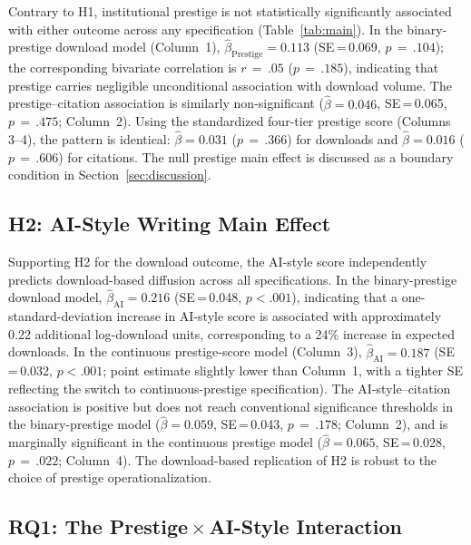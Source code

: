 \documentclass[12pt,a4paper]{article}
\begin{document}
Contrary to H1, institutional prestige is not statistically significantly
associated with either outcome across any specification
(Table~\ref{tab:main}).
In the binary-prestige download model (Column~1),
$\hat{\beta}_{\text{Prestige}} = 0.113$ (SE\,=\,0.069, $p\,=\,.104$);
the corresponding bivariate correlation is $r\,=\,.05$ ($p\,=\,.185$),
indicating that prestige carries negligible unconditional association
with download volume.
The prestige--citation association is similarly non-significant
($\hat{\beta} = 0.046$, SE\,=\,0.065, $p\,=\,.475$; Column~2).
Using the standardized four-tier prestige score (Columns 3--4),
the pattern is identical: $\hat{\beta} = 0.031$ ($p\,=\,.366$) for
downloads and $\hat{\beta} = 0.016$ ($p\,=\,.606$) for citations.
The null prestige main effect is discussed as a boundary condition in
Section~\ref{sec:discussion}.

\subsection{H2: AI-Style Writing Main Effect}

Supporting H2 for the download outcome, the AI-style score independently
predicts download-based diffusion across all specifications.
In the binary-prestige download model,
$\hat{\beta}_{\text{AI}} = 0.216$ (SE\,=\,0.048, $p<.001$),
indicating that a one-standard-deviation increase in AI-style score
is associated with approximately 0.22 additional log-download units,
corresponding to a 24\% increase in expected downloads.
In the continuous prestige-score model (Column~3),
$\hat{\beta}_{\text{AI}} = 0.187$ (SE\,=\,0.032, $p<.001$;
point estimate slightly lower than Column~1, with a tighter SE
reflecting the switch to continuous-prestige specification).
The AI-style--citation association is positive but does not reach
conventional significance thresholds in the binary-prestige model
($\hat{\beta} = 0.059$, SE\,=\,0.043, $p\,=\,.178$; Column~2),
and is marginally significant in the continuous prestige model
($\hat{\beta} = 0.065$, SE\,=\,0.028, $p\,=\,.022$; Column~4).
The download-based replication of H2 is robust to the choice of
prestige operationalization.

\subsection[RQ1: Prestige x AI-Style Interaction]{RQ1: The Prestige\,$\times$\,AI-Style Interaction}
\end{document}
